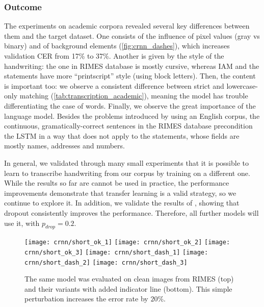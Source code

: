 		\subsubsection*{Outcome}
			The experiments on academic corpora revealed several key differences between them and the target dataset. One consists of the influence of pixel values (gray vs binary) and of background elements (\autoref{fig:crnn_dashes}), which increases validation CER from 17\% to 37\%. Another is given by the style of the handwriting: the one in RIMES database is mostly cursive, whereas IAM and the statements have more ``printscript'' style (using block letters). Then, the content is important too: we observe a consistent difference between strict and lowercase-only matching (\autoref{tab:transcription_academic}), meaning the model has trouble differentiating the case of words. Finally, we observe the great importance of the language model. Besides the problems introduced by using an English corpus, the continuous, gramatically-correct sentences in the RIMES database precondition the LSTM in a way that does not apply to the statements, whose fields are mostly names, addresses and numbers.

			In general, we validated through many small experiments that it is possible to learn to transcribe handwriting from our corpus by training on a different one. While the results so far are cannot be used in practice, the performance improvements demonstrate that transfer learning is a valid strategy, so we continue to explore it. In addition, we validate the results of \citet{MDLSTM_dropout}, showing that dropout consistently improves the performance. Therefore, all further models will use it, with \(p_\mathit{drop} = 0.2\).

			\begin{figure}
				\texttt{[image: crnn/short\_ok\_1]}
				\texttt{[image: crnn/short\_ok\_2]}
				\texttt{[image: crnn/short\_ok\_3]}
				\texttt{[image: crnn/short\_dash\_1]}
				\texttt{[image: crnn/short\_dash\_2]}
				\texttt{[image: crnn/short\_dash\_3]}
				\caption[Influence of backgrond elements]{The same model  was evaluated on clean images from RIMES (top) and their variants with added indicator line (bottom). This simple perturbation increases the error rate by \(20\%\). }
				\label{fig:crnn_dashes}
			\end{figure}

